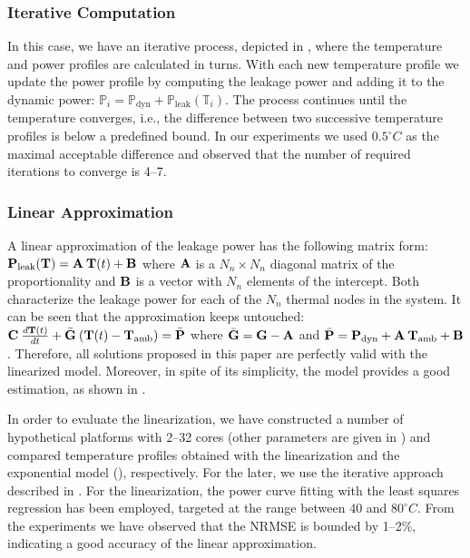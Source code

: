 \subsubsection{Iterative Computation}

In this case, we have an iterative process, depicted in , where
the temperature and power profiles are calculated in turns. With each new
temperature profile we update the power profile by computing the leakage power
and adding it to the dynamic power: $\mathbb{P}_i = \mathbb{P}_\text{dyn} +
\mathbb{P}_\text{leak}(\mathbb{T}_i)$. The process continues until the
temperature converges, i.e., the difference between two successive temperature
profiles is below a predefined bound. In our experiments we used $0.5^\circ C$
as the maximal acceptable difference and observed that the number of required
iterations to converge is 4--7.

\subsubsection{Linear Approximation}

A linear approximation of the leakage power has the following matrix form:
$\mathbf{P}_\text{leak}(\mathbf{T}) = \mathbf{A} \: \mathbf{T}(t) + \mathbf{B}$ where $\mathbf{A}$ is a $N_n
\times N_n$ diagonal matrix of the proportionality and $\mathbf{B}$ is a vector with
$N_n$ elements of the intercept. Both characterize the leakage power for each of
the $N_n$ thermal nodes in the system. It can be seen that the approximation
keeps  untouched: $\mathbf{C} \:
\frac{d\mathbf{T}(t)}{dt} + \bar{\mathbf{G}} \: (\mathbf{T}(t) - \mathbf{T}_{\mathrm{amb}}) = \bar{\mathbf{P}}$
where $\bar{\mathbf{G}} = \mathbf{G} - \mathbf{A}$ and $\bar{\mathbf{P}} = \mathbf{P}_\text{dyn} + \mathbf{A}
\: \mathbf{T}_{\mathrm{amb}} + \mathbf{B}$. Therefore, all solutions proposed in this paper are
perfectly valid with the linearized model. Moreover, in spite of its simplicity,
the model provides a good estimation, as shown in \cite{liu2007}.

In order to evaluate the linearization, we have constructed a number of
hypothetical platforms with 2--32 cores (other parameters are given in
) and compared temperature profiles obtained with the
linearization and the exponential model (), respectively. For
the later, we use the iterative approach described in .
For the linearization, the power curve fitting with the least squares regression
\cite{press2007} has been employed, targeted at the range between 40 and
$80^\circ C$. From the experiments we have observed that the NRMSE is bounded by
1--2\%, indicating a good accuracy of the linear approximation.

